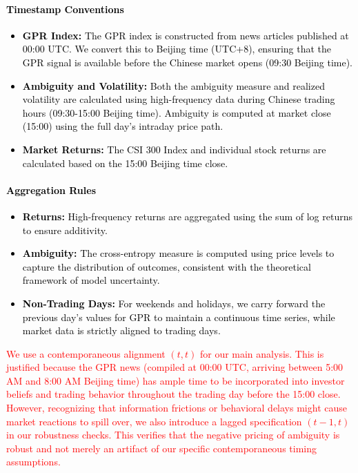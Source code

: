 \documentclass[preprint,12pt,authoryear]{elsarticle}
\begin{document}
\paragraph{\textcolor{black}{Timestamp Conventions}}
\textcolor{black}{\begin{itemize}
    \item \textbf{GPR Index:} The GPR index is constructed from news articles published at 00:00 UTC. We convert this to Beijing time (UTC+8), ensuring that the GPR signal is available before the Chinese market opens (09:30 Beijing time).
    \item \textbf{Ambiguity and Volatility:} Both the ambiguity measure and realized volatility are calculated using high-frequency data during Chinese trading hours (09:30-15:00 Beijing time). Ambiguity is computed at market close (15:00) using the full day's intraday price path.
    \item \textbf{Market Returns:} The CSI 300 Index and individual stock returns are calculated based on the 15:00 Beijing time close.
\end{itemize}}

\paragraph{\textcolor{black}{Aggregation Rules}}
\textcolor{black}{\begin{itemize}
    \item \textbf{Returns:} High-frequency returns are aggregated using the sum of log returns to ensure additivity.
    \item \textbf{Ambiguity:} The cross-entropy measure is computed using price levels to capture the distribution of outcomes, consistent with the theoretical framework of model uncertainty.
    \item \textbf{Non-Trading Days:} For weekends and holidays, we carry forward the previous day's values for GPR to maintain a continuous time series, while market data is strictly aligned to trading days.
\end{itemize}}

\textcolor{red}{We use a contemporaneous alignment $(t, t)$ for our main analysis. This is justified because the GPR news (compiled at 00:00 UTC, arriving between 5:00 AM and 8:00 AM Beijing time) has ample time to be incorporated into investor beliefs and trading behavior throughout the trading day before the 15:00 close. However, recognizing that information frictions or behavioral delays might cause market reactions to spill over, we also introduce a lagged specification $(t-1, t)$ in our robustness checks. This verifies that the negative pricing of ambiguity is robust and not merely an artifact of our specific contemporaneous timing assumptions.}
\end{document}
